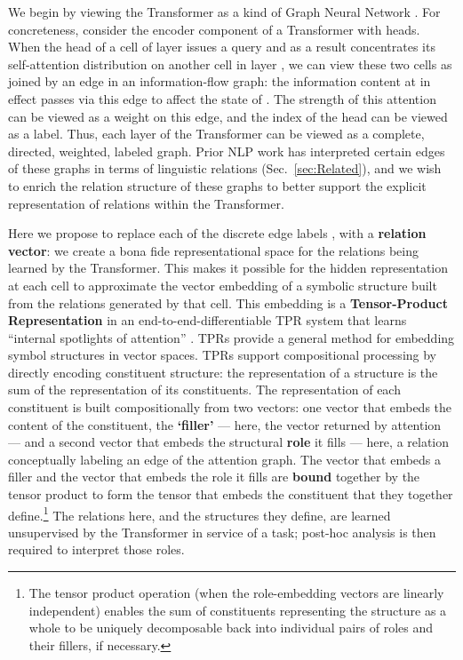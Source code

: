 \documentclass[11pt,a4paper]{article}
\newcommand{\newterm}[1]{{\bf #1}}
\begin{document}
We begin by viewing the Transformer as a kind of Graph Neural Network \citep[e.g.,][]{gori2005new, GK95a, battaglia2018relational}. 
For concreteness, consider the encoder component of a Transformer with  heads. 
When the  head of a cell  of layer  issues a query and as a result concentrates its self-attention distribution on another cell  in layer , we can view these two cells as joined by an edge in an information-flow graph: the information content at  in effect passes via this edge to affect the state of . 
The strength of this attention can be viewed as a weight on this edge, and the index  of the head can be viewed as a label. 
Thus, each layer of the Transformer can be viewed as a complete, directed, weighted, labeled graph.
Prior NLP work has interpreted certain edges of these graphs in terms of linguistic relations (Sec.~\ref{sec:Related}), and we wish to enrich the relation structure of these graphs to better support the explicit representation of relations within the Transformer. 

Here we propose to replace each of the discrete edge labels , with a \newterm{relation vector}: we create a bona fide representational space for the relations being learned by the Transformer.
This makes it possible for the hidden representation at each cell to approximate the vector embedding of a symbolic structure built from the relations generated by that cell.
This embedding is a \newterm{Tensor-Product Representation} \citep[\newterm{TPR};][]{Smolensky:1990:TPV:102418.102425} in an end-to-end-differentiable TPR system \citep{schlag2018nips, Schmidhuber:93ratioicann} that learns ``internal spotlights of attention'' \citep{Schmidhuber:93ratioicann}.
TPRs provide a general method for embedding symbol structures in vector spaces.
TPRs support compositional processing by directly encoding constituent structure: the representation of a structure is the sum of the representation of its constituents.
The representation of each constituent is built compositionally from two vectors: one vector that embeds the content of the constituent, the \newterm{`filler'} --- here, the vector returned by attention --- and a second vector that embeds the structural \newterm{role} it fills --- here, a relation conceptually labeling an edge of the attention graph.
The vector that embeds a filler and the vector that embeds the role it fills are \newterm{bound} together by the tensor product to form the tensor that embeds the constituent that they together define.\footnote{
The tensor product operation (when the role-embedding vectors are linearly independent) enables the sum of constituents representing the structure as a whole to be uniquely decomposable back into individual pairs of roles and their fillers, if necessary.}
The relations here, and the structures they define, are learned unsupervised by the Transformer in service of a task; post-hoc analysis is then required to interpret those roles.
\end{document}
